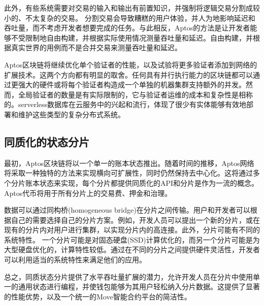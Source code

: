 \documentclass{article}
\begin{document}
此外，有些系统需要对交易的输入和输出有前置知识，并强制将逻辑交易分割成较小的、不太复杂的交易。 分割交易会导致糟糕的用户体验，并人为地影响延迟和吞吐量，而不考虑开发者想要完成的任务。与此相反，Aptos的方法是让开发者能够不受限制地自由构建，并根据实际使用情况测量吞吐量和延迟。自由构建，并根据真实世界的用例而不是合并交易来测量吞吐量和延迟。

Aptos区块链将继续优化单个验证者的性能，以及试验将更多验证者添加到网络的扩展技术。这两个方向都有明显的取舍。任何具有并行执行能力的区块链都可以通过更强大的硬件或将每个验证者构造成一个单独的机器集群支持额外的并发。然而，全局验证者的数量是有实际限制的，它与验证者运维的成本和复杂性是相称的。serverless数据库在云服务中的兴起和流行，体现了很少有实体能够有效地部署和维护这些类型的复杂分布式系统。


\subsection{同质化的状态分片}
最初，Aptos区块链将以一个单一的账本状态推出。随着时间的推移，Aptos网络将采取一种独特的方法来实现横向可扩展性，同时仍然保持去中心化。这将通过多个分片账本状态来实现，每个分片都提供同质化的API和分片是作为一流的概念。Aptos代币将用于所有分片上的交易费、押金和治理。

数据可以通过同构桥(homogeneous bridge)在分片之间传输。用户和开发者可以根据自己的需要选择自己的分片方案。例如，开发人员可以提出一个新的分片，或在现有的分片内对用户进行集群，以实现分片内的高连接。此外，分片可能有不同的系统特性。 一个分片可能是对固态硬盘(SSD)计算优化的，而另一个分片可能是为大型硬盘优化的，计算特性较低。通过在不同的分片之间提供硬件灵活性，开发者可以利用适当的系统特性来满足他们的应用。

总之，同质状态分片提供了水平吞吐量扩展的潜力，允许开发人员在分片中使用单一的通用状态进行编程，并使钱包能够为其用户轻松纳入分片数据。这提供了显著的性能优势，以及一个统一的Move智能合约平台的简洁性。

\nocite{*}

\small{

}
\end{document}
